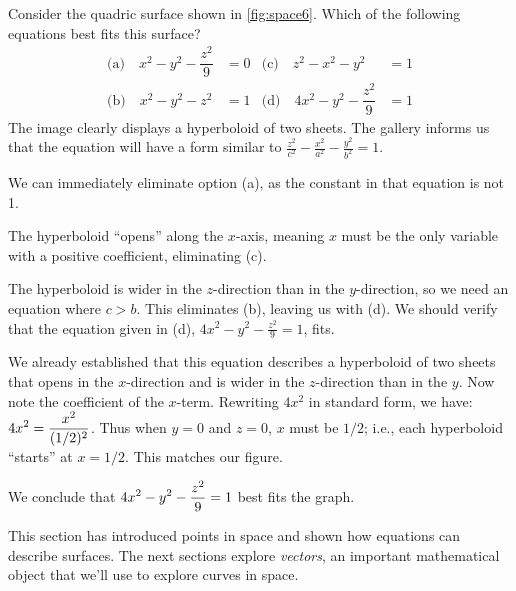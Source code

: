 \begin{example}\label{ex_space6}%
Consider the quadric surface shown in \autoref{fig:space6}. Which of the following equations best fits this surface?
\begin{align*}
\text{(a)}\quad x^2-y^2-\dfrac{z^2}{9}&=0 & \text{(c)}\quad z^2-x^2-y^2&=1 \\
\text{(b)}\quad x^2-y^2-z^2&=1 & \text{(d)}\quad 4x^2-y^2-\dfrac{z^2}9&=1
\end{align*}
\solution
The image clearly displays a hyperboloid of two sheets. The gallery informs us that the equation will have a form similar to $\frac{z^2}{c^2}-\frac{x^2}{a^2}-\frac{y^2}{b^2}=1$. 

We can immediately eliminate option (a), as the constant in that equation is not 1.


The hyperboloid ``opens'' along the $x$-axis, meaning $x$ must be the only variable with a  positive coefficient, eliminating (c).

The hyperboloid is wider in the $z$-direction than in the $y$-direction, so we need an equation where $c>b$. This eliminates (b), leaving us with (d). We should verify that the equation given in (d), $4x^2-y^2-\frac{z^2}9=1$, fits.

We already established that this equation describes a hyperboloid of two sheets that opens in the $x$-direction and is wider in the $z$-direction than in the $y$. Now note the coefficient of the $x$-term. Rewriting $4x^2$ in standard form, we have: $\displaystyle 4x^2 = \frac{x^2}{(1/2)^2}$. Thus when $y=0$ and $z=0$, $x$ must be $1/2$; i.e., each hyperboloid ``starts'' at $x=1/2$. This matches our figure.

We conclude that $\displaystyle 4x^2-y^2-\frac{z^2}9=1$ best fits the graph.
\end{example}

This section has introduced points in space and shown how equations can describe surfaces. The next sections explore \emph{vectors}, an important mathematical object that we'll use to explore curves in space.

